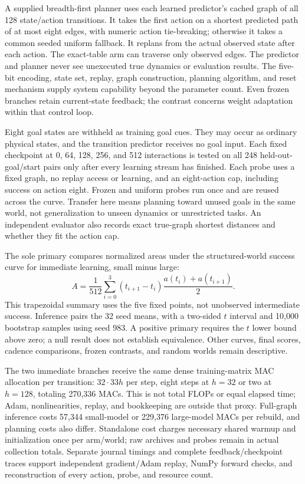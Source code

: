 \documentclass[11pt]{article}
\begin{document}
A supplied breadth-first planner uses each learned predictor's cached graph
of all 128 state/action transitions. It takes the first action on a shortest
predicted path of at most eight edges, with numeric action tie-breaking;
otherwise it takes a common seeded uniform fallback. It replans from the
actual observed state after each action. The exact-table arm can traverse only
observed edges. The predictor and planner never see unexecuted true dynamics
or evaluation results. The five-bit encoding, state set, replay, graph
construction, planning algorithm, and reset mechanism supply system capability
beyond the parameter count. Even frozen branches retain current-state feedback;
the contrast concerns weight adaptation within that control loop.

Eight goal states are withheld as training goal cues. They may occur as
ordinary physical states, and the transition predictor receives no goal input.
Each fixed checkpoint at 0, 64, 128, 256, and 512 interactions is tested on
all 248 held-out-goal/start pairs only after every learning stream has finished.
Each probe uses a fixed graph, no replay access or learning, and an eight-action
cap, including success on action eight. Frozen and uniform probes run once and
are reused across the curve. Transfer here means planning toward unused goals
in the same world, not generalization to unseen dynamics or unrestricted tasks.
An independent evaluator also records exact true-graph shortest distances and
whether they fit the action cap.

The sole primary compares normalized areas under the structured-world success
curve for immediate learning, small minus large:
\[
 A=\frac{1}{512}\sum_{i=0}^{3}(t_{i+1}-t_i)
             \frac{a(t_i)+a(t_{i+1})}{2}.
\]
This trapezoidal summary uses the five fixed points, not unobserved intermediate
success. Inference pairs the 32 seed means, with a two-sided $t$ interval and
10,000 bootstrap samples using seed 983. A positive primary requires the
$t$ lower bound above zero; a null result does not establish equivalence.
Other curves, final scores, cadence comparisons, frozen contrasts, and random
worlds remain descriptive.

The two immediate branches receive the same dense training-matrix MAC
allocation per transition: $32\cdot33h$ per step, eight steps at $h=32$ or two
at $h=128$, totaling 270,336 MACs. This is not total FLOPs or equal elapsed time;
Adam, nonlinearities, replay, and bookkeeping are outside that proxy.
Full-graph inference costs 57,344 small-model or 229,376 large-model MACs per
rebuild, and planning costs also differ. Standalone cost charges necessary
shared warmup and initialization once per arm/world; raw archives and probes
remain in actual collection totals. Separate journal timings and complete
feedback/checkpoint traces support independent gradient/Adam replay, NumPy
forward checks, and reconstruction of every action, probe, and resource count.
\end{document}

